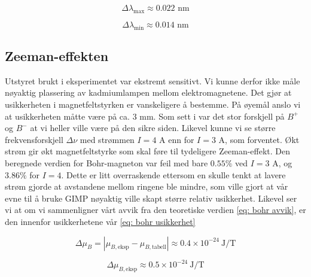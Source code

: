 \documentclass[reprint,norsk,notitlepage,floatfix]{revtex4-2}
\begin{document}
    \begin{equation}\label{eq: gitter opplosning max}
      Δλ_{\text{max}} ≈ 0.022 \text{ nm}
    \end{equation}
    
    \begin{equation}\label{eq: gitter opplosning min}
      Δλ_{\text{min}} ≈ 0.014 \text{ nm}
    \end{equation}



  \subsection{Zeeman-effekten}
    Utstyret brukt i eksperimentet var ekstremt sensitivt. Vi kunne derfor ikke måle nøyaktig plassering av kadmiumlampen mellom elektromagnetene. Det gjør at usikkerheten i magnetfeltstyrken er vanskeligere å bestemme. På øyemål anslo vi at usikkerheten måtte være på ca. 3 mm. Som sett i 
    var det stor forskjell på $B^{+}$ og $B^{-}$ at vi heller ville være på den sikre siden. Likevel kunne vi se større frekvensforskjell $Δν$ med strømmen $I = 4$ A enn for $I = 3$ A, som forventet. Økt strøm gir økt magnetfeltstyrke som skal føre til tydeligere Zeeman-effekt. Den beregnede verdien for Bohr-magneton var feil med bare $0.55\%$ ved $I = 3$ A, og $3.86\%$ for $I = 4$. Dette er litt overraskende ettersom en skulle tenkt at lavere strøm gjorde at avstandene mellom ringene ble mindre, som ville gjort at vår evne til å bruke GIMP nøyaktig ville skapt større relativ usikkerhet. Likevel ser vi at om vi sammenligner vårt avvik fra den teoretiske verdien \cref{eq: bohr avvik}, er den innenfor usikkerhetene vår \cref{eq: bohr usikkerhet}
    
    \begin{equation}\label{eq: bohr avvik}
      \Delta \mu_B = \left|\mu_{B,\text{eksp}} - \mu_{B,\text{tabell}}\right| \approx 0.4\times 10^{-24}\:\text{J/T}  
    \end{equation}
    
    \begin{equation}\label{eq: bohr usikkerhet}
      \Delta \mu_{B,\text{eksp}} \approx 0.5 \times 10^{-24}\:\text{J/T}    
    \end{equation}
  
\end{document}
